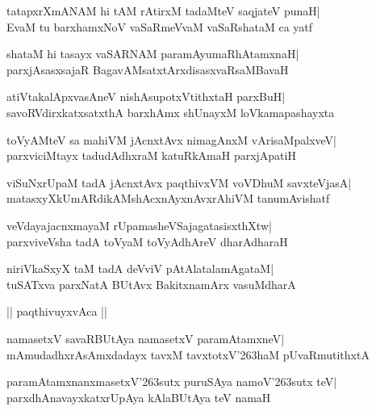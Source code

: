 \documentclass[twoside,12pt,openright]{book}
\def\S{\char'263}
\newcounter{shloka}[chapter]
\begin{document}
\begin{shloka}%
tatapxrXmANAM hi tAM rAtirxM tadaMteV saqjateV punaH|\\
EvaM tu barxhamxNoV vaSaRmeVvaM vaSaRshataM ca yatf
\end{shloka}

\begin{shloka}%
shataM hi tasayx vaSARNAM paramAyumaRhAtamxnaH|\\
parxjAsasxsajaR BagavAMsatxtArxdisasxvaRsaMBavaH
\end{shloka}

\begin{shloka}%
atiVtakalApxvasAneV nishAsupotxVtithxtaH parxBuH|\\
savoRVdirxkatxsatxthA barxhAmx shUnayxM loVkamapashayxta
\end{shloka}

\begin{shloka}%
toVyAMteV sa mahiVM jAcnxtAvx nimagAnxM vArisaMpalxveV|\\
parxviciMtayx tadudAdhxraM katuRkAmaH parxjApatiH
\end{shloka}

\begin{shloka}%
viSuNxrUpaM tadA jAcnxtAvx paqthivxVM voVDhuM savxteVjasA|\\
matasxyXkUmARdikAMshAcxnAyxnAvxrAhiVM tanumAvishatf
\end{shloka}

\begin{shloka}%
veVdayajacnxmayaM rUpamasheVSajagatasisxthXtw|\\
parxviveVsha tadA toVyaM toVyAdhAreV dharAdharaH
\end{shloka}

\begin{shloka}%
niriVkaSxyX taM tadA deVviV pAtAlatalamAgataM|\\
tuSATxva parxNatA BUtAvx BakitxnamArx vasuMdharA
\end{shloka}

\begin{center}
|| paqthivuyxvAca ||
\end{center}
\begin{shloka}%
namasetxV savaRBUtAya namasetxV paramAtamxneV|\\
mAmudadhxrAsAmxdadayx tavxM tavxtotxV\S haM pUvaRmutithxtA\\
\end{shloka}

\begin{shloka}%
paramAtamxnanxmasetxV\S sutx puruSAya namoV\S sutx teV|\\
parxdhAnavayxkatxrUpAya kAlaBUtAya teV namaH
\end{shloka}
\end{document}
